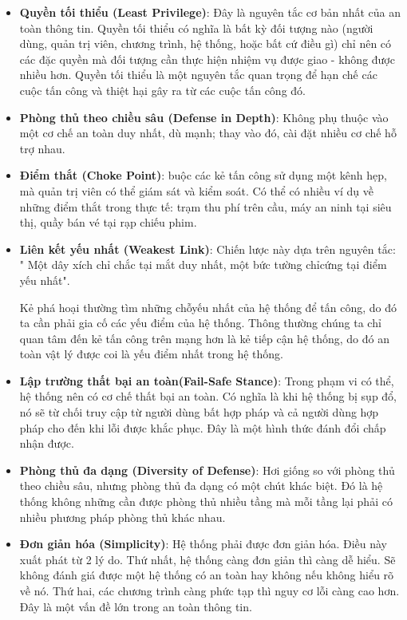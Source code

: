 \begin{itemize}
    \item \textbf{Quyền tối thiểu (Least Privilege)}: Đây là nguyên tắc cơ bản nhất của an toàn thông tin. Quyền tối thiểu có nghĩa là bất kỳ đối tượng nào (người dùng, quản trị viên, chương trình, hệ thống, hoặc bất cứ điều gì) chỉ nên có các đặc quyền mà đối tượng cần thực hiện nhiệm vụ được giao - không được nhiều hơn. Quyền tối thiểu là một nguyên tắc quan trọng để hạn chế các cuộc tấn công và thiệt hại gây ra từ các cuộc tấn công đó.
    \item \textbf{Phòng thủ theo chiều sâu (Defense in Depth)}: Không phụ thuộc vào một cơ chế an toàn duy nhất, dù mạnh; thay vào đó, cài đặt nhiều cơ chế hỗ trợ nhau. 
    \item \textbf{Điểm thắt (Choke Point)}: buộc các kẻ tấn công sử dụng một kênh hẹp, mà quản trị viên có thể giám sát và kiểm soát. Có thể có nhiều ví dụ về những điểm thắt trong thực tế: trạm thu phí trên cầu, máy an ninh tại siêu thị, quầy bán vé tại rạp chiếu phim.
    \item \textbf{Liên kết yếu nhất (Weakest Link)}: Chiến lược này dựa trên nguyên tắc: " Một dây xích chỉ chắc tại mắt duy nhất, một bức tường chỉcứng tại điểm yếu nhất". 
    
    Kẻ phá hoại thường tìm những chỗyếu nhất của hệ thống để tấn công, do đó ta cần phải gia cố các yếu điểm của hệ thống. Thông thường chúng ta chỉ quan tâm đến kẻ tấn công trên mạng hơn là kẻ tiếp cận hệ thống, do đó an toàn vật lý được coi là yếu điểm nhất trong hệ thống.
    \item \textbf{Lập trường thất bại an toàn(Fail-Safe Stance)}: Trong phạm vi có thể, hệ thống nên có cơ chế thất bại an toàn. Có nghĩa là khi hệ thống bị sụp đổ, nó sẽ từ chối truy cập từ người dùng bất hợp pháp và cả người dùng hợp pháp cho đến khi lỗi được khắc phục. Đây là một hình thức đánh đổi chấp nhận được. 
    \item \textbf{Phòng thủ đa dạng (Diversity of Defense)}: Hơi giống so với phòng thủ theo chiều sâu, nhưng phòng thủ đa dạng có một chút khác biệt. Đó là hệ thống không những cần được phòng thủ nhiều tầng mà mỗi tầng lại phải có nhiều phương pháp phòng thủ khác nhau. 
    \item \textbf{Đơn giản hóa (Simplicity)}: Hệ thống phải được đơn giản hóa. Điều này xuất phát từ 2 lý do. Thứ nhất, hệ thống càng đơn giản thì càng dễ hiểu. Sẽ không đánh giá được một hệ thống có an toàn hay không nếu không hiểu rõ về nó. Thứ hai, các chương trình càng phức tạp thì nguy cơ lỗi càng cao hơn. Đây là một vấn đề lớn trong an toàn thông tin.
\end{itemize}

